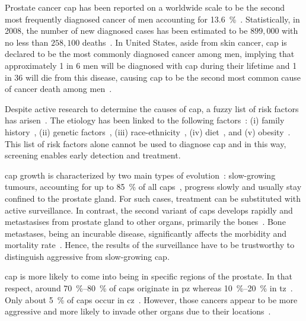 Prostate cancer \ac{cap} has been reported on a worldwide scale to be the
second most frequently diagnosed cancer of men accounting for
\SI{13.6}{\percent}~\cite{Ferlay2010}.
Statistically, in 2008, the number of new diagnosed cases has been estimated to
be $899,000$ with no less than $258,100$ deaths~\cite{Ferlay2010}.
In United States, aside from skin cancer, \ac{cap} is declared to be the most
commonly diagnosed cancer among men, implying that approximately 1 in 6 men
will be diagnosed with \ac{cap} during their lifetime and 1 in 36 will die from
this disease, causing \ac{cap} to be the second most common cause of cancer
death among men~\cite{Siegel2013,Society2013}.

Despite active research to determine the causes of \ac{cap}, a fuzzy list of
risk factors has arisen~\cite{Society2010}.
The etiology has been linked to the following factors~\cite{Society2010}: (i)
family history~\cite{Giovannucci2007,Steinberg1990}, (ii) genetic
factors~\cite{Freedman2006,Amundadottir2006,Agalliu2009}, (iii)
race-ethnicity~\cite{Giovannucci2007,Hoffman2001}, (iv)
diet~\cite{Giovannucci2007,Ma2009,Alexander2010}, and (v)
obesity~\cite{Giovannucci2007,Rodriguez2007}.
This list of risk factors alone cannot be used to diagnose \ac{cap} and in this
way, screening enables early detection and treatment.

\ac{cap} growth is characterized by two main types of
evolution~\cite{Strum2005}: slow-growing tumours, accounting for up to
\SI{85}{\percent} of all \acp{cap}~\cite{Lu-Yao2009}, progress slowly and
usually stay confined to the prostate gland.
For such cases, treatment can be substituted with active surveillance.
In contrast, the second variant of \acp{cap} develops rapidly and metastasises
from prostate gland to other organs, primarily the bones~\cite{Oster2013}.
Bone metastases, being an incurable disease, significantly affects the
morbidity and mortality rate~\cite{Ye2007}.
Hence, the results of the surveillance have to be trustworthy to
distinguish aggressive from slow-growing \ac{cap}.

\ac{cap} is more likely to come into being in specific regions of the prostate.
In that respect, around \SIrange{70}{80}{\percent} of \acp{cap} originate in
\ac{pz} whereas \SIrange{10}{20}{\percent} in
\ac{tz}~\cite{Carrol1987,McNeal1988,Stamey1998}.
Only about \SI{5}{\percent} of \acp{cap} occur in
\ac{cz}~\cite{McNeal1988,Cohen2008}.
However, those cancers appear to be more aggressive and more likely to invade
other organs due to their locations~\cite{Cohen2008}.
